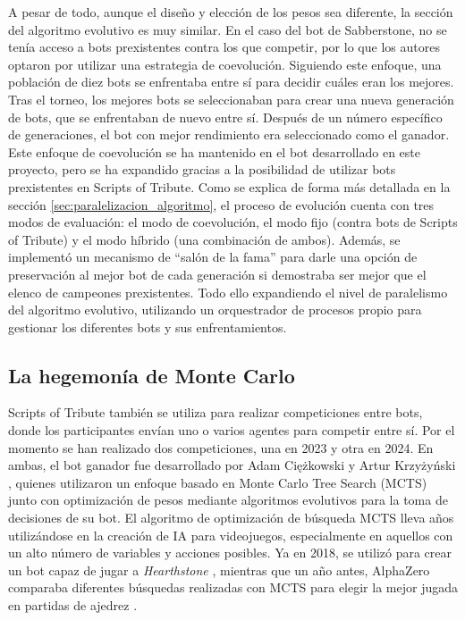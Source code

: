 A pesar de todo, aunque el diseño y elección de los pesos sea diferente, la sección del algoritmo evolutivo es muy similar. En el caso del bot de Sabberstone, no se tenía acceso a bots prexistentes contra los que competir, por lo que los autores optaron por utilizar una estrategia de coevolución. Siguiendo este enfoque, una población de diez bots se enfrentaba entre sí para decidir cuáles eran los mejores. Tras el torneo, los mejores bots se seleccionaban para crear una nueva generación de bots, que se enfrentaban de nuevo entre sí. Después de un número específico de generaciones, el bot con mejor rendimiento era seleccionado como el ganador. Este enfoque de coevolución se ha mantenido en el bot desarrollado en este proyecto, pero se ha expandido gracias a la posibilidad de utilizar bots prexistentes en Scripts of Tribute. Como se explica de forma más detallada en la sección \ref{sec:paralelizacion_algoritmo}, el proceso de evolución cuenta con tres modos de evaluación: el modo de coevolución, el modo fijo (contra bots de Scripts of Tribute) y el modo híbrido (una combinación de ambos). Además, se implementó un mecanismo de ``salón de la fama'' para darle una opción de preservación al mejor bot de cada generación si demostraba ser mejor que el elenco de campeones prexistentes. Todo ello expandiendo el nivel de paralelismo del algoritmo evolutivo, utilizando un orquestrador de procesos propio para gestionar los diferentes bots y sus enfrentamientos.


\subsection{La hegemonía de Monte Carlo} \label{sec:mcts_cog}

Scripts of Tribute también se utiliza para realizar competiciones entre bots, donde los participantes envían uno o varios agentes para competir entre sí. Por el momento se han realizado dos competiciones, una en 2023 y otra en 2024. En ambas, el bot ganador fue desarrollado por Adam Ciężkowski y Artur Krzyżyński \cite{adam_ciezkowski_developing_2023}, quienes utilizaron un enfoque basado en Monte Carlo Tree Search (MCTS) junto con optimización de pesos mediante algoritmos evolutivos para la toma de decisiones de su bot. El algoritmo de optimización de búsqueda MCTS lleva años utilizándose en la creación de IA para videojuegos, especialmente en aquellos con un alto número de variables y acciones posibles. Ya en 2018, se utilizó para crear un bot capaz de jugar a \textit{Hearthstone} \cite{swiechowski_improving_2018}, mientras que un año antes, AlphaZero comparaba diferentes búsquedas realizadas con MCTS para elegir la mejor jugada en partidas de ajedrez \cite{silver_mastering_2017}.

